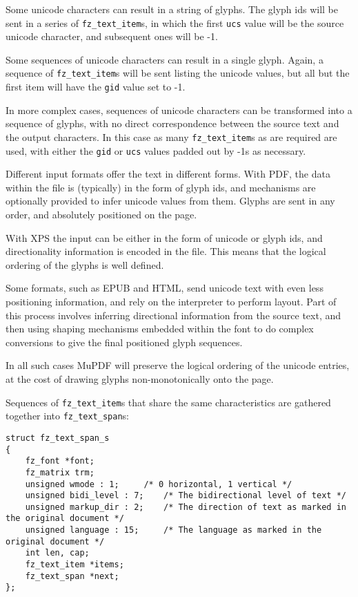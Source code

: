 \documentclass[oneside]{book}
\begin{document}
Some unicode characters can result in a string of glyphs. The glyph ids will be sent in a series of \texttt{fz\_text\_item}s, in which the first \texttt{ucs} value will be the source unicode character, and subsequent ones will be -1.

Some sequences of unicode characters can result in a single glyph. Again, a sequence of \texttt{fz\_text\_item}s will be sent listing the unicode values, but all but the first item will have the \texttt{gid} value set to -1.

In more complex cases, sequences of unicode characters can be transformed into a sequence of glyphs, with no direct correspondence between the source text and the output characters. In this case as many \texttt{fz\_text\_item}s as are required are used, with either the \texttt{gid} or \texttt{ucs} values padded out by -1s as necessary.

Different input formats offer the text in different forms. With PDF, the data within the file is (typically) in the form of glyph ids, and mechanisms are optionally provided to infer unicode values from them. Glyphs are sent in any order, and absolutely positioned on the page.

With XPS the input can be either in the form of unicode or glyph ids, and directionality information is encoded in the file. This means that the logical ordering of the glyphs is well defined.

Some formats, such as EPUB and HTML, send unicode text with even less positioning information, and rely on the interpreter to perform layout. Part of this process involves inferring directional information from the source text, and then using shaping mechanisms embedded within the font to do complex conversions to give the final positioned glyph sequences.

In all such cases MuPDF will preserve the logical ordering of the unicode entries, at the cost of drawing glyphs non-monotonically onto the page.

Sequences of \texttt{fz\_text\_item}s that share the same characteristics are gathered together into \texttt{fz\_text\_span}s:

\begin{lstlisting}
struct fz_text_span_s
{
	fz_font *font;
	fz_matrix trm;
	unsigned wmode : 1;		/* 0 horizontal, 1 vertical */
	unsigned bidi_level : 7;	/* The bidirectional level of text */
	unsigned markup_dir : 2;	/* The direction of text as marked in the original document */
	unsigned language : 15;		/* The language as marked in the original document */
	int len, cap;
	fz_text_item *items;
	fz_text_span *next;
};
\end{lstlisting}
\end{document}
